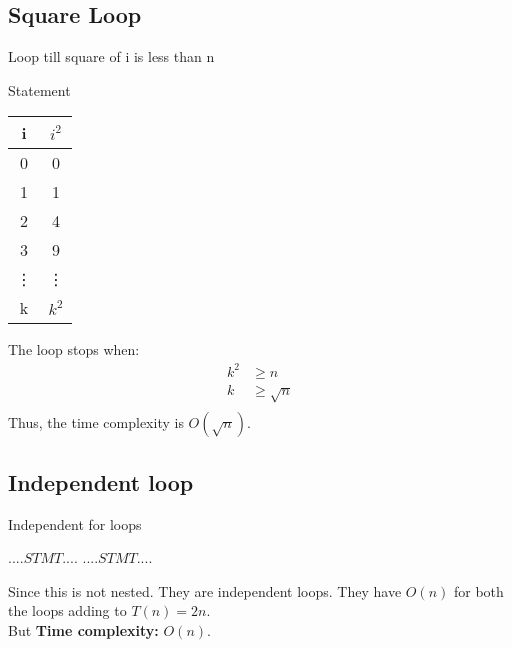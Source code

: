 \documentclass{article}
\begin{document}
\subsection{Square Loop}
\begin{algorithm}[H]
    \caption{Loop till square of i is less than n}
    \begin{algorithmic}
    \State Statement
    \EndFor
    \end{algorithmic}
\end{algorithm}

\begin{table}[H]
    \begin{tabular}{|c|c|}
        \hline
        i & $i^2$\\
        \hline
        0 & 0\\
        1 & 1\\
        2 & 4\\
        3 & 9\\
        \vdots & \vdots\\
        k & $k^2$\\
        \hline
    \end{tabular}
\end{table}

\noindent The loop stops when:
\[
\begin{aligned}
    k^2 &\geq n\\
    k &\geq \sqrt{n}\\
\end{aligned}
\]
Thus, the time complexity is $O(\sqrt{n})$.

\subsection{Independent loop}
\begin{algorithm}[H]
    \caption{Independent for loops}\label{simple_for}
    \begin{algorithmic}
            \State $....STMT....$
        \EndFor
            \State $....STMT....$
        \EndFor
    \end{algorithmic}
\end{algorithm}
\noindent
Since this is not nested. They are independent loops. They have $O(n)$ for both the loops adding to $T(n) = 2n$. \\
But \textbf{Time complexity:} $O(n)$.
\end{document}
